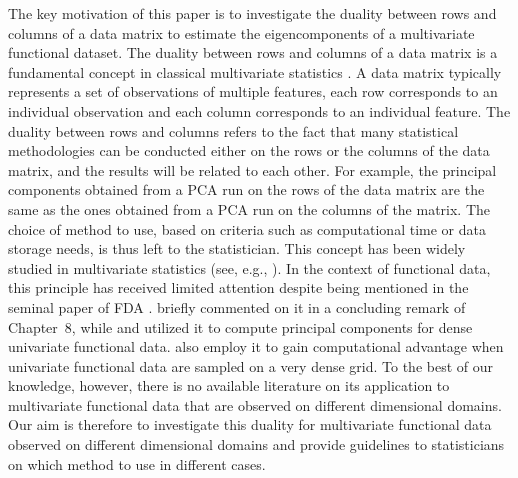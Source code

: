 The key motivation of this paper is to investigate the duality between rows and columns of a data matrix to estimate the eigencomponents of a multivariate functional dataset. The duality between rows and columns of a data matrix is a fundamental concept in classical multivariate statistics \citep{escofierTraitementSimultaneVariables1979,saportaSimultaneousAnalysisQualitative1990}. A data matrix typically represents a set of observations of multiple features, each row corresponds to an individual observation and each column corresponds to an individual feature. The duality between rows and columns refers to the fact that many statistical methodologies can be conducted either on the rows or the columns of the data matrix, and the results will be related to each other. For example, the principal components obtained from a PCA run on the rows of the data matrix are the same as the ones obtained from a PCA run on the columns of the matrix. The choice of method to use, based on criteria such as computational time or data storage needs, is thus left to the statistician. This concept has been widely studied in multivariate statistics (see, e.g., \cite{pagesMultipleFactorAnalysis2014,hardleAppliedMultivariateStatistical2019}). In the context of functional data, this principle has received limited attention despite being mentioned in the seminal paper of FDA \citep{ramsayWhenDataAre1982a}. \cite{ramsayFunctionalDataAnalysis2005} briefly commented on it in a concluding remark of Chapter~8, while \cite{kneipInferenceDensityFamilies2001} and \cite{benkoCommonFunctionalPrincipal2009} utilized it to compute principal components for dense univariate functional data. \cite{chenQuantifyingInfiniteDimensionalData2017} also employ it to gain computational advantage when univariate functional data are sampled on a very dense grid. To the best of our knowledge, however, there is no available literature on its application to multivariate functional data that are observed on different dimensional domains. Our aim is therefore to investigate this duality for multivariate functional data observed on different dimensional domains and provide guidelines to statisticians on which method to use in different cases.


